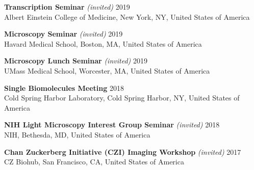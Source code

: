 \documentclass[margin,line]{res}
\begin{document}
\begin{resume}
\vspace*{-2.5mm}
{\bf  Transcription Seminar} {\it (invited)}  \hfill 2019\\
Albert Einstein College of Medicine, New York, NY, United States of America%

\vspace*{-2.5mm}
{\bf  Microscopy Seminar} {\it (invited)} \hfill 2019\\
Havard Medical School, Boston, MA, United States of America%

\vspace*{-2.5mm}
{\bf Microscopy Lunch Seminar} {\it (invited)}  \hfill 2019\\
UMass Medical School, Worcester, MA, United States of America%

\vspace*{-2.5mm}
{\bf Single Biomolecules Meeting}   \hfill 2018\\
Cold Spring Harbor Laboratory, Cold Spring Harbor, NY, United States of America %

\vspace*{-2.5mm}
{\bf NIH Light Microscopy Interest Group Seminar} {\it (invited)}   \hfill 2018\\
 NIH, Bethesda, MD, United States of America %

\vspace*{-2.5mm}
{\bf Chan Zuckerberg Initiative (CZI) Imaging Workshop} {\it (invited)}  \hfill 2017\\
 CZ Biohub, San Francisco, CA, United States of America%


\end{resume}
\end{document}
